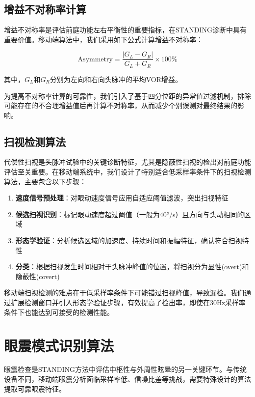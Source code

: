 \subsection{增益不对称率计算}

增益不对称率是评估前庭功能左右平衡性的重要指标，在STANDING诊断中具有重要价值。移动端算法中，我们采用如下公式计算增益不对称率：

\begin{equation}
\text{Asymmetry} = \frac{|G_L - G_R|}{G_L + G_R} \times 100\%
\end{equation}

其中，$G_L$和$G_R$分别为左向和右向头脉冲的平均VOR增益。

为提高不对称率计算的可靠性，我们引入了基于四分位距的异常值过滤机制，排除可能存在的不合理增益值后再计算不对称率，从而减少个别误测对最终结果的影响。

\subsection{扫视检测算法}

代偿性扫视是头脉冲试验中的关键诊断特征，尤其是隐蔽性扫视的检出对前庭功能评估至关重要。在移动端系统中，我们设计了特别适合低采样率条件下的扫视检测算法，主要包含以下步骤：

\begin{enumerate}
  \item \textbf{速度信号预处理}：对眼动速度信号应用自适应阈值滤波，突出扫视特征
  \item \textbf{候选扫视识别}：标记眼动速度超过阈值（一般为40°/s）且方向与头动相同的区域
  \item \textbf{形态学验证}：分析候选区域的加速度、持续时间和振幅特征，确认符合扫视特性
  \item \textbf{分类}：根据扫视发生时间相对于头脉冲峰值的位置，将扫视分为显性(overt)和隐蔽性(covert)
\end{enumerate}

移动端扫视检测的难点在于低采样率条件下可能错过扫视峰值，导致漏检。我们通过扩展检测窗口并引入形态学验证步骤，有效提高了检出率，即使在30Hz采样率条件下也能达到可接受的检测性能。

\section{眼震模式识别算法}

眼震检查是STANDING方法中评估中枢性与外周性眩晕的另一关键环节。与传统设备不同，移动端眼震分析面临采样率低、信噪比差等挑战，需要特殊设计的算法提取可靠眼震特征。

